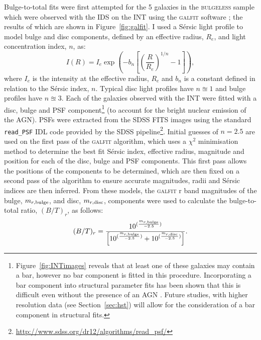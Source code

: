 {Bulge-to-total fits were first attempted for the 5 galaxies in the \textsc{bulgeless} sample which were observed with the IDS on the INT using the \textsc{galfit} software \citep{peng02}; the results of which are shown in Figure~\ref{fig:galfit}. I used a S\'ersic light profile \citep{sersic68} to model bulge and disc components, defined by an effective radius, $R_e$, and light concentration index, $n$, as:
\begin{equation}\label{sersic}
I(R) = I_e \exp \left(  -b_n \left[  \left( \frac{R}{R_e}\right)^{1/n} -1 \right] \right),
\end{equation}
where $I_e$ is the intensity at the effective radius, $R_e$ and $b_n$ is a constant defined in relation to the S\'ersic index, $n$. Typical disc light profiles have $n\approxeq1$ and bulge profiles have $n\approxeq3$. Each of the galaxies observed with the INT were fitted with a disc, bulge and PSF component\footnote{Figure~\ref{fig:INTimages} reveals that at least one of these galaxies may contain a bar, however no bar component is fitted in this procedure. Incorporating a bar component into structural parameter fits has been shown that this is difficult even without the presence of an AGN \citep{kruk16}. Future studies, with higher resolution data (see Section~\ref{sec:hst}) will allow for the consideration of a bar component in structural fits.} (to account for the bright nuclear emission of the AGN). PSFs were extracted from the SDSS FITS images using the standard \texttt{read\_PSF} IDL code provided by the SDSS pipeline\footnote{\url{http://www.sdss.org/dr12/algorithms/read_psf/}}. Initial guesses of $n=2.5$ are used on the first pass of the \textsc{galfit} algorithm, which uses a $\chi^2$ minimisation method to determine the best fit S\'ersic index, effective radius, magnitude and position for each of the disc, bulge and PSF components. This first pass allows the positions of the components to be determined, which are then fixed on a second pass of the algorithm to ensure accurate magnitudes, radii and S\'ersic indices are then inferred. From these models, the \textsc{galfit} r band magnitudes of the bulge, $m_{r, \rm{bulge}}$, and disc, $m_{r, \rm{disc}}$, components were used to calculate the bulge-to-total ratio, $(B/T)_r$, as follows:
\begin{equation}\label{btratio}
(B/T)_r = \frac{10^{(\frac{m_{r, \rm{bulge}}}{-2.5})}}{\left[10^{(\frac{m_{r, \rm{bulge}}}{-2.5})} + 10^{(\frac{m_{r, \rm{disc}}}{-2.5})}\right]}.
\end{equation}

}
